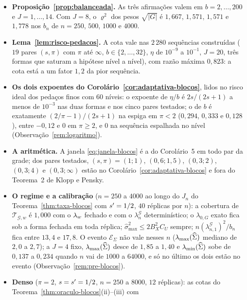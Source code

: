 \documentclass[11pt,a4paper]{article}
\newcommand{\lmin}{\lambda_{\min}}
\newcommand{\lmaxx}{\lambda_{\max}}
\newcommand{\smax}{\widehat{\sigma}_{\max}}
\newcommand{\bn}{b_{n}}
\newcommand{\lamG}{\lambda^{\mathcal{G}}_{n}}
\newcommand{\lamGone}{\lambda^{\mathcal{G}}_{n,1}}
\newcommand{\lamz}[1]{\lambda_{0,#1}}
\newcommand{\Tw}{\mathcal{T}_{\mathcal{G},w}}
\newcommand{\ESig}{\mathcal{E}_{\Sigma}}
\begin{document}
\begin{itemize}[nosep, leftmargin=*]
  \item \textbf{Proposição~\ref{prop:balanceada}.} As três afirmações valem em
    $b = 2,\dots,200$ e $J = 1,\dots,14$. Com $J = 8$, o $\varrho^{2}$ dos pesos
    $\sqrt{|G|}$ é $1{,}667$, $1{,}571$, $1{,}571$ e $1{,}778$ nos $\bn$ de
    $n = 250$, $500$, $1000$ e $4000$.
  \item \textbf{Lema~\ref{lem:risco-pedacos}.} A cota vale nas $2\,280$
    sequências construídas ($19$ pares $(s,\pi)$ com $\pi$ até $\infty$,
    $b \in \{2,\dots,32\}$, $\eta$ de $10^{-9}$ a $10^{-1}$, $J = 20$, três
    formas que saturam a hipótese nível a nível), com razão máxima $0{,}823$:
    a cota está a um fator $1{,}2$ da pior sequência.
  \item \textbf{Os dois expoentes do Corolário~\ref{cor:adaptativa-blocos}},
    lidos no risco ideal dos pedaços finos com $60$ níveis: o expoente de
    $\eta/b$ é $2s/(2s+1)$ a menos de $10^{-3}$ nas duas formas e nos cinco
    pares testados; o de $b$ é exatamente $(2/\pi-1)/(2s+1)$ na espiga em
    $\pi < 2$ ($0{,}294$, $0{,}333$ e $0{,}128$), entre $-0{,}12$ e $0$ em
    $\pi \ge 2$, e $0$ na sequência espalhada no nível
    (Observação~\ref{rem:logaritmo}).
  \item \textbf{A aritmética.} A janela \eqref{eq:janela-blocos} é a do
    Corolário~5 em todo par da grade; dos pares testados, $(s,\pi) = (1;1)$,
    $(0{,}6;1{,}5)$, $(0{,}3;2)$, $(0{,}3;4)$ e $(0{,}3;\infty)$ estão no
    Corolário~\ref{cor:adaptativa-blocos} e fora do Teorema~2 de Klopp e
    Pensky.
  \item \textbf{O regime e a calibração} ($n = 250$ a $4000$ ao longo do
    $J_{n}$ do Teorema~\ref{thm:taxa-blocos} com $s' = 1/2$, $40$ réplicas
    por $n$): a cobertura de $\Tw$ é $1{,}000$ com o $\lambda_{w}$ fechado e com o
    $\lamG$ determinístico; o $\lamz{G}$ exato fica sob a forma fechada em
    toda réplica; $\smax^{2} \le 2B_{X}^{2}C_{U}$ sempre; $n(\lamGone)^{2}/\bn$
    fica entre $13{,}4$ e $17{,}8$. O evento $\ESig$ não vale nesses $n$
    ($\lmaxx(\Gramhat)$ mediano de $2{,}0$ a $2{,}7$); a $J = 4$ fixo,
    $\lmaxx(\Gramhat)$ desce de $1{,}85$ a $1{,}40$ e $\lmin(\Gramhat)$ sobe de
    $0{,}137$ a $0{,}234$ quando $n$ vai de $1000$ a $64000$, e só no último
    os dois estão no evento (Observação~\ref{rem:pre-blocos}).
  \item \textbf{Denso} ($\pi = 2$, $s = s' = 1/2$, $n = 250$ a $8000$, $12$
    réplicas): as cotas do Teorema~\ref{thm:oraculo-blocos}(ii)--(iii) com

\end{itemize}
\end{document}
